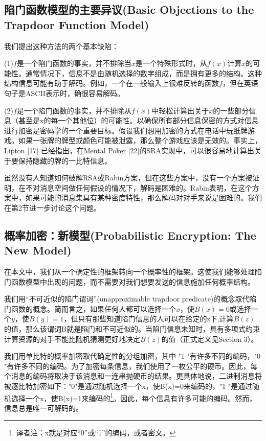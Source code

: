 \documentclass[]{article}
\begin{document}
\subsection{陷门函数模型的主要异议(Basic Objections to the Trapdoor Function Model)}

我们提出这种方法的两个基本缺陷：

(1)$f$是一个陷门函数的事实，并不排除当$x$是一个特殊形式时，从$f(x)$计算$x$的可能性。通常情况下，信息不是由随机选择的数字组成，而是拥有更多的结构。这种结构信息可能有助于解码。例如，一个在一般输入上很难反转的函数$f$，但在英语句子是ASCII表示时，确很容易解码。

(2)$f$是一个陷门函数的事实，并不排除从$f(x)$中轻松计算出关于$x$的一些部分信息（甚至是x的每一个其他位）的可能性。以确保所有部分信息保密的方式对信息进行加密是密码学的一个重要目标。假设我们想用加密的方式在电话中玩纸牌游戏。如果一张牌的牌型或颜色可能被泄露，那么整个游戏应该是无效的。事实上，Lipton [17] 已经指出，在Mental Poker [22]的SRA实现中，可以很容易地计算出关于要保持隐藏的牌的一比特信息。


虽然没有人知道如何破解RSA或Rabin方案，但在这些方案中，没有一个方案被证明，在不对消息空间做任何假设的情况下，解码是困难的。Rabin表明，在这个方案中，如果可能的消息集具有某种密度特性，那么解码对对手来说是困难的。我们在第2节进一步讨论这个问题。


\subsection{概率加密：新模型(Probabilistic Encryption: The New Model)}

在本文中，我们从一个确定性的框架转向一个概率性的框架。这使我们能够处理陷门函数模型中出现的问题，而不需要对我们想要发送的信息施加任何概率结构。

我们用“不可近似的陷门谓词”(unapproximable trapdoor predicate)的概念取代陷门函数的概念。简而言之，如果任何人都可以选择一个$x$，使$B(x)=0$或选择一个$y$，使$B(y)=1$，但只有那些知道陷门信息的人可以在给定的z下,计算$B(z)$的值，那么该谓词B就是陷门和不可近似的。当陷门信息未知时，具有多项式约束计算资源的对手不能比随机猜测更好地决定$B(z)$的值（正式定义见Section 3）。

我们用单比特的概率加密取代确定性的分组加密，其中 "1 "有许多不同的编码，"0 "有许多不同的编码。为了加密每条信息，我们使用了一枚公平的硬币。因此，每个消息的编码将取决于该消息和一连串抛硬币的结果。更具体地说，二进制消息将被逐比特加密如下："0"是通过随机选择一个x，使B(x)=0来编码的，"1 "是通过随机选择一个x，使B(x)=1来编码的\footnote{译者注：x就是对应“0”或“1”的编码，或者密文。}。因此，每个信息有许多可能的编码。然而，信息总是唯一可解码的。
\end{document}
